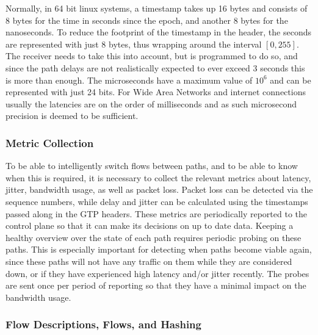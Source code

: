 Normally, in 64 bit linux systems, a timestamp takes up 16 bytes and consists of 8 bytes for the time in seconds since the epoch, and another 8 bytes for the nanoseconds. To reduce the footprint of the timestamp in the header, the seconds are represented with just 8 bytes, thus wrapping around the interval $[0,255]$. The receiver needs to take this into account, but is programmed to do so, and since the path delays are not realistically expected to ever exceed 3 seconds this is more than enough. The microseconds have a maximum value of $10^6$ and can be represented with just 24 bits. For Wide Area Networks and internet connections usually the latencies are on the order of milliseconds and as such microsecond precision is deemed to be sufficient.

\subsubsection{Metric Collection}

To be able to intelligently switch flows between paths, and to be able to know when this is required, it is necessary to collect the relevant metrics about latency, jitter, bandwidth usage, as well as packet loss. Packet loss can be detected via the sequence numbers, while delay and jitter can be calculated using the timestamps passed along in the GTP headers. These metrics are periodically reported to the control plane so that it can make its decisions on up to date data. Keeping a healthy overview over the state of each path requires periodic probing on these paths. This is especially important for detecting when paths become viable again, since these paths will not have any traffic on them while they are considered down, or if they have experienced high latency and/or jitter recently. The probes are sent once per period of reporting so that they have a minimal impact on the bandwidth usage.

\subsubsection{Flow Descriptions, Flows, and Hashing}

